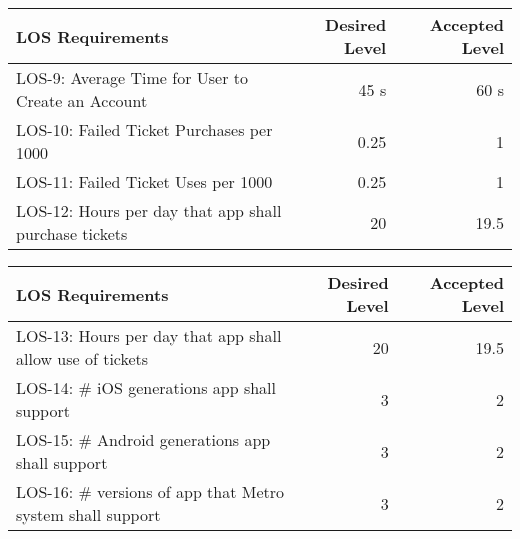 \begin{frame}
\begin{table}[h]
    \begin{tabularx}{\textwidth}{Xrr}
    \hline
    LOS Requirements                                                                                          									& Desired Level & Accepted Level \\ \hline
    LOS-9: Average Time for User to Create an Account							& 45 s			& 60 s            \\
    LOS-10: Failed Ticket Purchases per 1000 									& 0.25  		& 1              \\
    LOS-11: Failed Ticket Uses per 1000  										& 0.25  		& 1              \\
    LOS-12: Hours per day that app shall purchase tickets 						& 20  			& 19.5             \\
    \hline
    \end{tabularx}
\end{table}
\end{frame}    
\begin{frame}
\begin{table}[h]
    \begin{tabularx}{\textwidth}{Xrr}
    \hline
    LOS Requirements                                                                                          									& Desired Level & Accepted Level \\ \hline
    LOS-13: Hours per day that app shall allow use of tickets   				& 20 			& 19.5             \\
    LOS-14: \# iOS generations app shall support 								& 3  			& 2              \\
    LOS-15: \# Android generations app shall support   							& 3  			& 2              \\
    LOS-16: \# versions of app that Metro system shall support  				& 3    			& 2              \\
    \hline
    \end{tabularx}
\end{table}
\end{frame}